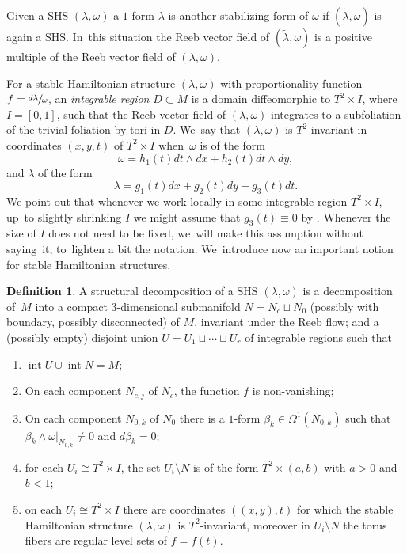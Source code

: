 \documentclass[10pt]{amsart}
\theoremstyle{definition}
\newtheorem{defi}[theorem]{Definition}
\begin{document}
Given a SHS $(\lambda,\omega)$ a $1$-form $\widetilde{\lambda}$ is another stabilizing form of $\omega$ if $(\widetilde{\lambda}, \omega)$ is again a SHS. In~this situation the Reeb vector field of $(\widetilde{\lambda},\omega)$ is a positive multiple of the Reeb vector field of $(\lambda,\omega)$.

For a stable Hamiltonian structure $(\lambda,\omega)$ with proportionality function $f=\sfrac{d\lambda}{\omega}$, an \textit{integrable region} $D\subset M$ is a domain diffeomorphic to $T^2\times I$, where $I=[0,1]$, such that the Reeb vector field of $(\lambda,\omega)$ integrates to a subfoliation of the trivial foliation by tori in $D$. We~say that $(\lambda,\omega)$ is $T^2$-invariant in coordinates $(x,y,t)$ of $T^2\times I$ when~$\omega$ is of the form
\begin{equation}\label{eq-omegaonreg}
\omega= h_1(t) dt\wedge dx + h_2(t) dt\wedge dy,
\end{equation}
and $\lambda$ of the form
\begin{equation}\label{eq-lambdaonreg}
\lambda = g_1(t) dx + g_2(t) dy + g_3(t)dt.
\end{equation}
We point out that whenever we work locally in some integrable region $T^2\times I$, up~to slightly shrinking $I$ we might assume that $g_3(t)\equiv 0$ by \cite[Lem.\,3.9]{CV1}. Whenever the size of $I$ does not need to be fixed, we~will make this assumption without saying~it, to~lighten a bit the notation. We~introduce now an important notion for stable Hamiltonian structures.
\begin{defi}\label{defn-strucdecom}
A structural decomposition of a SHS $(\lambda,\omega)$ is a decomposition of~$M$ into a compact $3$-dimensional submanifold $N=N_c \sqcup N_0$ (possibly with boundary, possibly disconnected) of $M$, invariant under the Reeb flow; and a (possibly empty) disjoint union $U=U_1\sqcup \cdots\sqcup U_r$ of integrable regions such that
\begin{enumerate}
\item\label{defn-strucdecom1} $\operatorname{int}U \cup \operatorname{int}N=M$;
\item\label{defn-strucdecom2} On each component $N_{c,j}$ of $N_c$, the function $f$ is non-vanishing;
\item\label{defn-strucdecom3} On each component $N_{0,k}$ of $N_0$ there is a $1$-form $\beta_k \in \Omega^1(N_{0,k})$ such that $\beta_k\wedge \omega|_{N_{0,k}}\neq 0$ and $d\beta_k=0$;
\item\label{defn-strucdecom4} for each $U_i\cong T^2\times I$, the set $U_i\setminus N$ is of the form $T^2\times (a,b)$ with $a>0$ and $b<1$;
\item\label{defn-strucdecom5} on each $U_i\cong T^2\times I$ there are coordinates $((x,y),t)$ for which the stable Hamiltonian structure $(\lambda,\omega)$ is $T^2$-invariant, moreover in $U_i\setminus N$ the torus fibers are regular level sets of $f=f(t)$.
\end{enumerate}
\end{defi}
\end{document}
